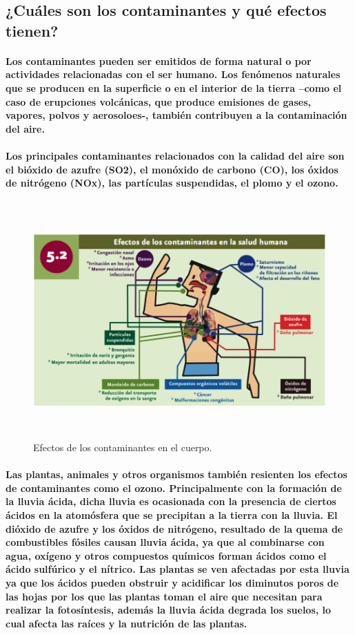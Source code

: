     \subsection {¿Cuáles son los contaminantes y qué efectos tienen?}
    \paragraph {Los contaminantes pueden ser emitidos de forma natural o por actividades relacionadas con el ser humano. Los fenómenos naturales que se producen en la superficie o  en el interior de la tierra –como el caso de erupciones volcánicas, que produce emisiones de gases, vapores, polvos y aerosoloes-, también contribuyen a la contaminación del aire.}
      
    \paragraph {Los principales contaminantes relacionados con la calidad del aire son el bióxido de azufre (SO2), el monóxido de carbono (CO), los óxidos  de nitrógeno (NOx), las partículas suspendidas, el plomo y el ozono.}
    
  	\begin{figure}[h!]
	  	\centering
  	      \includegraphics[width=12.5cm,height=9cm]{./images/1.png}
  	    \caption{Efectos de los contaminantes en el cuerpo.}
	\end{figure}
    \paragraph {Las plantas, animales y otros organismos también resienten los efectos de contaminantes como el ozono. Principalmente con la formación de la lluvia ácida, dicha lluvia es ocasionada con la presencia de ciertos ácidos en la atomósfera que se precipitan a la tierra con la lluvia. El dióxido de azufre y los óxidos de nitrógeno, resultado de la quema de combustibles  fósiles causan lluvia ácida, ya que al combinarse con agua, oxígeno y otros compuestos químicos forman ácidos como el ácido sulfúrico y el nítrico. Las plantas se ven afectadas por esta lluvia ya que los ácidos pueden obstruir y acidificar los diminutos poros de las hojas por los que las plantas toman el aire que necesitan para realizar la fotosíntesis, además la lluvia ácida degrada los suelos, lo cual afecta las raíces y la nutrición de las plantas.}
    
